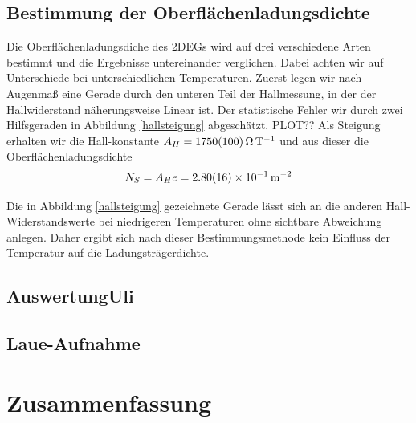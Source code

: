 \documentclass[paper=a4,fontsize=10pt,DIV=18,twocolumn,parskip=half]{scrartcl}
\numberwithin{equation}{section}    %
\begin{document}
\subsection{Bestimmung der Oberflächenladungsdichte}
Die Oberflächenladungsdiche des 2DEGs wird auf drei verschiedene Arten bestimmt und die Ergebnisse untereinander verglichen. Dabei achten wir auf Unterschiede bei unterschiedlichen Temperaturen. Zuerst legen wir nach Augenmaß eine Gerade durch den unteren Teil der Hallmessung, in der der Hallwiderstand näherungsweise Linear ist. Der statistische Fehler wir durch zwei Hilfsgeraden in Abbildung \ref{hallsteigung} abgeschätzt. 
PLOT??
Als Steigung erhalten wir die Hall-konstante $A_H=\SI{1750+-100}{\ohm\per\tesla}$ und aus dieser die Oberflächenladungsdichte
\begin{equation}
N_S=A_H e = \SI{2.80 \pm 0.16e-1}{\per\square\meter}
\label{ns1}
\end{equation}

Die in Abbildung \ref{hallsteigung} gezeichnete Gerade lässt sich an die anderen Hall-Widerstandswerte bei niedrigeren Temperaturen ohne sichtbare Abweichung anlegen. Daher ergibt sich nach dieser Bestimmungsmethode kein Einfluss der Temperatur auf die Ladungsträgerdichte.



\subsection{AuswertungUli}
\label{AuswertungUli}
\subsection{Laue-Aufnahme}
\label{07_Auswertung}


%
\section{Zusammenfassung}
\label{Zusammenfassung}
\end{document}
